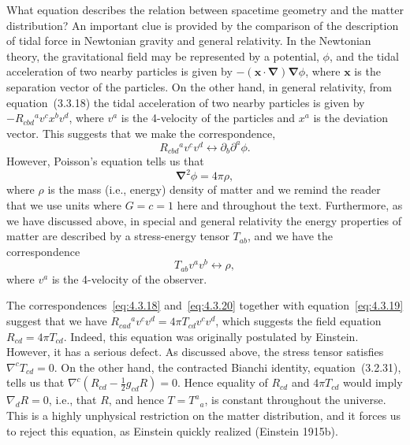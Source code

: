 What equation describes the relation between spacetime geometry and the matter
distribution? An important clue is provided by the comparison of the description of
tidal force in Newtonian gravity and general relativity. In the Newtonian theory, the
gravitational field may be represented by a potential, \(\phi\), and the tidal
acceleration of two nearby particles is given by
\(-(\mathbf{x}\mathbin{\cdot}\boldsymbol{\nabla})\boldsymbol{\nabla}\phi\), where \(\mathbf{x}\) is
the separation vector of the particles. On the other hand, in general relativity,
from equation~(3.3.18) the tidal acceleration of two nearby particles is given by
\(-R_{cbd}{}^av^cx^bv^d\), where \(v^a\) is the 4-velocity of the particles
and \(x^a\) is the deviation vector. This suggests that we make the
correspondence,
\begin{equation}
  R_{cbd}{}^av^cv^d\longleftrightarrow\partial_b\partial^a\phi .
  \tag{4.3.18}\label{eq:4.3.18}
\end{equation}
However, Poisson's equation tells us that
\begin{equation}
  \boldsymbol{\nabla}^2\phi=4\pi\rho ,
  \tag{4.3.19}\label{eq:4.3.19}
\end{equation}
where \(\rho\) is the mass (i.e., energy) density of matter and we remind the
reader that we use units where \(G=c=1\) here and throughout the text.
Furthermore, as we have discussed above, in special and general relativity the
energy properties of matter are described by a stress-energy tensor \(T_{ab}\),
and we have the correspondence
\begin{equation}
  T_{ab}v^av^b\longleftrightarrow\rho ,
  \tag{4.3.20}\label{eq:4.3.20}
\end{equation}
where \(v^a\) is the 4-velocity of the observer.

The correspondences~\eqref{eq:4.3.18} and~\eqref{eq:4.3.20} together with
equation~\eqref{eq:4.3.19} suggest that we have
\(R_{cad}{}^av^cv^d=4\pi T_{cd}v^cv^d\), which suggests the field equation
\(R_{cd}=4\pi T_{cd}\). Indeed, this equation was originally postulated by
Einstein. However, it has a serious defect. As discussed above, the stress tensor
satisfies \(\nabla^cT_{cd}=0\). On the other hand, the contracted Bianchi
identity, equation~(3.2.31), tells us that
\(\nabla^c(R_{cd}-\frac12g_{cd}R)=0\). Hence equality of \(R_{cd}\) and
\(4\pi T_{cd}\) would imply \(\nabla_dR=0\), i.e., that \(R\), and hence
\(T=T^a{}_a\), is constant throughout the universe. This is a highly unphysical
restriction on the matter distribution, and it forces us to reject this equation, as
Einstein quickly realized (Einstein 1915b).

